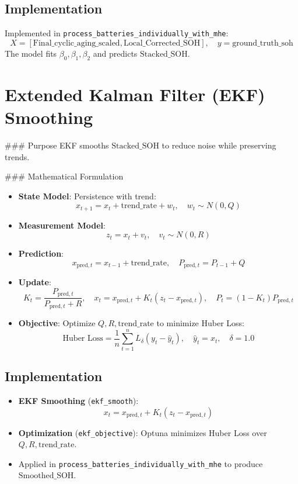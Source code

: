 \subsection{Implementation}
Implemented in \texttt{process\_batteries\_individually\_with\_mhe}:
\[
X = [\text{Final_cyclic_aging_scaled}, \text{Local_Corrected_SOH}], \quad y = \text{ground_truth_soh}
\]
The model fits \(\beta_0, \beta_1, \beta_2\) and predicts \(\text{Stacked_SOH}\).

\section{Extended Kalman Filter (EKF) Smoothing}

### Purpose
EKF smooths \(\text{Stacked_SOH}\) to reduce noise while preserving trends.

### Mathematical Formulation
\begin{itemize}
    \item \textbf{State Model}: Persistence with trend:
    \[
    x_{t+1} = x_t + \text{trend_rate} + w_t, \quad w_t \sim N(0, Q)
    \]
    \item \textbf{Measurement Model}:
    \[
    z_t = x_t + v_t, \quad v_t \sim N(0, R)
    \]
    \item \textbf{Prediction}:
    \[
    x_{\text{pred},t} = x_{t-1} + \text{trend_rate}, \quad P_{\text{pred},t} = P_{t-1} + Q
    \]
    \item \textbf{Update}:
    \[
    K_t = \frac{P_{\text{pred},t}}{P_{\text{pred},t} + R}, \quad x_t = x_{\text{pred},t} + K_t (z_t - x_{\text{pred},t}), \quad P_t = (1 - K_t) P_{\text{pred},t}
    \]
    \item \textbf{Objective}: Optimize \(Q, R, \text{trend_rate}\) to minimize Huber Loss:
    \[
    \text{Huber Loss} = \frac{1}{n} \sum_{t=1}^{n} L_\delta(y_t - \hat{y}_t), \quad \hat{y}_t = x_t, \quad \delta = 1.0
    \]
\end{itemize}

\subsection{Implementation}
\begin{itemize}
    \item \textbf{EKF Smoothing} (\texttt{ekf\_smooth}):
    \[
    x_t = x_{\text{pred},t} + K_t (z_t - x_{\text{pred},t})
    \]
    \item \textbf{Optimization} (\texttt{ekf\_objective}): Optuna minimizes Huber Loss over \(Q, R, \text{trend_rate}\).
    \item Applied in \texttt{process\_batteries\_individually\_with\_mhe} to produce \(\text{Smoothed_SOH}\).
\end{itemize}

